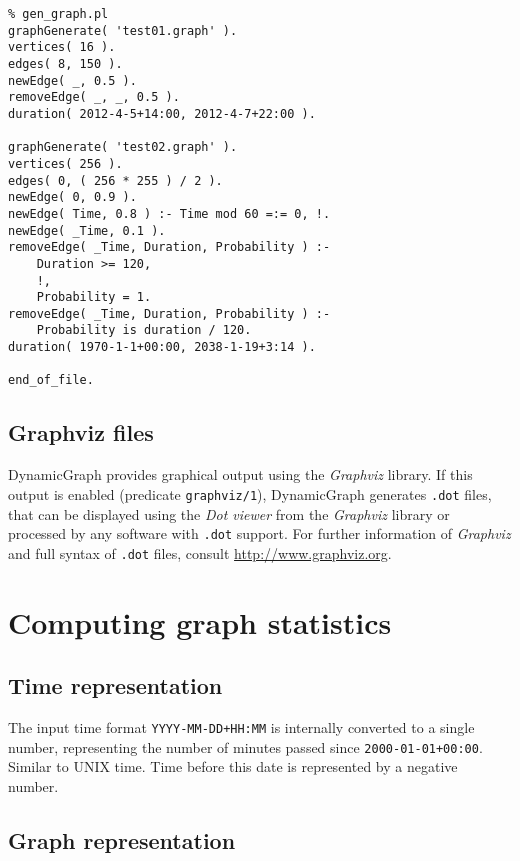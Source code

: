 \documentclass[11pt, a4paper,draft]{article}
\newcommand{\pl}[1]{\texttt{#1}} %
\theoremstyle{plain}
\theoremstyle{definition}
\theoremstyle{remark}
\newcommand{\gv}{\textit{Graphviz}}
\begin{document}
\begin{verbatim}
% gen_graph.pl
graphGenerate( 'test01.graph' ).
vertices( 16 ).
edges( 8, 150 ).
newEdge( _, 0.5 ).
removeEdge( _, _, 0.5 ).
duration( 2012-4-5+14:00, 2012-4-7+22:00 ).

graphGenerate( 'test02.graph' ).
vertices( 256 ).
edges( 0, ( 256 * 255 ) / 2 ).
newEdge( 0, 0.9 ).
newEdge( Time, 0.8 ) :- Time mod 60 =:= 0, !.
newEdge( _Time, 0.1 ).
removeEdge( _Time, Duration, Probability ) :-
    Duration >= 120,
    !,
    Probability = 1.
removeEdge( _Time, Duration, Probability ) :-
    Probability is duration / 120.
duration( 1970-1-1+00:00, 2038-1-19+3:14 ).

end_of_file.
\end{verbatim}

\subsection{Graphviz files}
\label{sec:files-graphviz}

DynamicGraph provides graphical output using the \gv{} library. 
If this output is enabled (predicate \pl{graphviz/1}), DynamicGraph generates \pl{.dot} files, 
that can be displayed using the \textit{Dot viewer} from the \gv{} library or processed
by any software with \texttt{.dot} support.
For further information of \gv{} and full syntax of \pl{.dot} files, consult \url{http://www.graphviz.org}.

\section{Computing graph statistics}
\label{sec:computing}



\subsection{Time representation}
\label{sec:computing-time}

The input time format \pl{YYYY-MM-DD+HH:MM} is internally converted to a single number,
representing the number of minutes passed since \pl{2000-01-01+00:00}. 
Similar to UNIX time. Time before this date is represented by a negative number.
 

\subsection{Graph representation}
\label{sec:computing-graph} 
\end{document}
